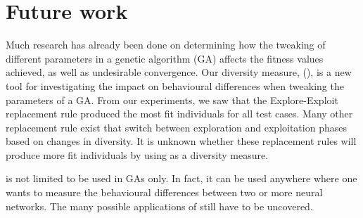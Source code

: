 \section{Future work}\label{sec:futurework}
Much research has already been done on determining how the tweaking of different parameters in a genetic algorithm (GA) affects the fitness values achieved, as well as undesirable convergence. Our diversity measure, \di{} (\dia{}), is a new tool for investigating the impact on behavioural differences when tweaking the parameters of a GA.
From our experiments, we saw that the Explore-Exploit replacement rule produced the most fit individuals for all test cases.
Many other replacement rule exist that switch between exploration and exploitation phases based on changes in diversity.
It is unknown whether these replacement rules will produce more fit individuals by using \dia{} as a diversity measure.

\dia{} is not limited to be used in GAs only. In fact, it can be used anywhere where one wants to measure the behavioural differences between two or more neural networks. The many possible applications of \dia{} still have to be uncovered.
